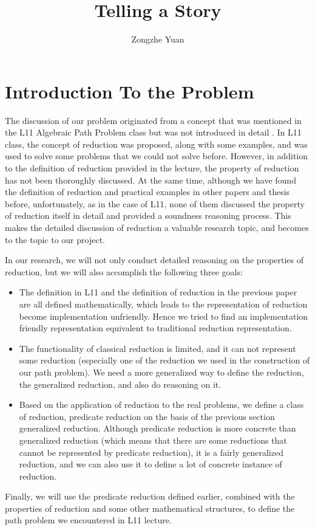 \documentclass[a4paper,10pt]{article}
\title{Telling a Story}
\author{Zongzhe Yuan}
\begin{document}
\maketitle

\section{Introduction To the Problem}
The discussion of our problem originated from a concept that was mentioned in the L11 Algebraic Path Problem class but was not introduced in detail \cite{griffin_2017}. In L11 class, the concept of reduction was proposed, along with some examples, and was used to solve some problems that we could not solve before. However, in addition to the definition of reduction provided in the lecture, the property of reduction has not been thoroughly discussed. At the same time, although we have found the definition of reduction and practical examples in other papers and thesis before, unfortunately, as in the case of L11, none of them discussed the property of reduction itself in detail and provided a soundness reasoning process. This makes the detailed discussion of reduction a valuable research topic, and becomes to the topic to our project.

In our research, we will not only conduct detailed reasoning on the properties of reduction, but we will also accomplish the following three goals:
\begin{itemize}
  \item The definition in L11 and the definition of reduction in the previous paper are all defined mathematically, which leads to the representation of reduction become implementation unfriendly. Hence we tried to find an implementation friendly representation equivalent to traditional reduction representation.
  \item The functionality of classical reduction is limited, and it can not represent some reduction (especially one of the reduction we used in the construction of our path problem). We need a more generalized way to define the reduction, the generalized reduction, and also do reasoning on it.
  \item Based on the application of reduction to the real problems, we define a class of reduction, predicate reduction on the basis of the previous section generalized reduction. Although predicate reduction is more concrete than generalized reduction (which means that there are some reductions that cannot be represented by predicate reduction), it is a fairly generalized reduction, and we can also use it to define a lot of concrete instance of reduction.
\end{itemize}
Finally, we will use the predicate reduction defined earlier, combined with the properties of reduction and some other mathematical structures, to define the path problem we encountered in L11 lecture.
\end{document}
